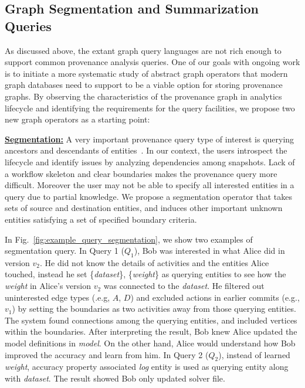 \documentclass[11pt]{article}
\newcommand{\eat}[1]{}
\newcommand{\topic}[1]{\vspace{3pt}\noindent\underline{\bf #1}}
\newcommand{\wasAttributedTo}{$\mathit A$}
\newcommand{\wasDerivedFrom}{$\mathit D$}
\begin{document}
\subsection{Graph Segmentation and Summarization Queries}
As discussed above, the extant graph query languages are not rich enough to support common provenance analysis queries. 
One of our goals with ongoing work is to initiate a more systematic study of
    abstract graph operators that modern graph databases need to support to be a viable option for storing provenance graphs. 
By observing the characteristics of the provenance graph in analytics lifecycle and identifying the requirements for the query facilities\eat{
(Sec.~\ref{subsec:datamodel})}, we propose two new graph operators as a starting point:


\topic{Segmentation:} A very important provenance query type of interest is querying ancestors and descendants of entities~\cite{freire2008provenance,pql_harvard@ipaw08}.
In our context, the users introspect the lifecycle and identify issues by analyzing dependencies among snapshots. Lack of a workflow
skeleton and clear boundaries makes the provenance query more difficult. Moreover the user may not be
able to specify all interested entities in a query due to partial knowledge. 
We propose a segmentation operator that takes sets of source and destination entities, and induces other important unknown entities 
satisfying a set of specified boundary criteria.

\vspace{-3pt}
\begin{example}
\label{exp:segop_q1_2}
In Fig.~\ref{fig:example_query_segmentation}, we show two examples of segmentation query. In Query 1 ($Q_1$), Bob was interested in what Alice did in version $v_2$. He did not know the details of activities and the entities Alice touched, instead he set \{\emph{dataset}\}, \{\emph{weight}\} as querying entities to see how the \emph{weight} in Alice's version $v_2$ was connected to the \emph{dataset}. He filtered out uninterested edge types (.e.g, \wasAttributedTo, \wasDerivedFrom) and excluded actions in earlier commits (e.g., $v_1$) by setting the boundaries as two activities away from those querying entities. \eat{In the figure, t}The system found connections among the querying entities, and included vertices within the boundaries. After interpreting the result, Bob knew Alice updated the model definitions in \emph{model}. On the other hand, Alice would understand how Bob improved the accuracy and learn from him. In Query 2 ($Q_2$), instead of learned \emph{weight}, accuracy property associated \emph{log} entity is used as querying entity along with \emph{dataset}. The result showed Bob only updated solver file. 
\end{example}
\end{document}
